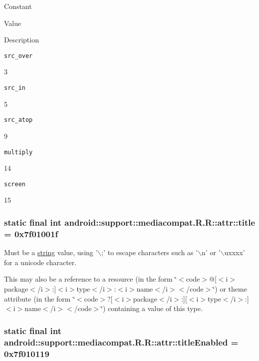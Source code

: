 Constant

Value

Description 

{\tt src\_\-over}

3

{\tt src\_\-in}

5

{\tt src\_\-atop}

9

{\tt multiply}

14

{\tt screen}

15\hypertarget{classandroid_1_1support_1_1mediacompat_1_1_r_1_1attr_e13bbc3f2499e6333d12d64127632045}{
\subsubsection[{title}]{\setlength{\rightskip}{0pt plus 5cm}static final int android::support::mediacompat.R.R::attr::title = 0x7f01001f}}
\label{classandroid_1_1support_1_1mediacompat_1_1_r_1_1attr_e13bbc3f2499e6333d12d64127632045}


Must be a \hyperlink{classandroid_1_1support_1_1mediacompat_1_1_r_1_1string}{string} value, using '$\backslash$;' to escape characters such as '$\backslash$n' or '$\backslash$uxxxx' for a unicode character. 

This may also be a reference to a resource (in the form \char`\"{}$<$code$>$@\mbox{[}$<$i$>$package$<$/i$>$:\mbox{]}$<$i$>$type$<$/i$>$:$<$i$>$name$<$/i$>$$<$/code$>$\char`\"{}) or theme attribute (in the form \char`\"{}$<$code$>$?\mbox{[}$<$i$>$package$<$/i$>$:\mbox{]}\mbox{[}$<$i$>$type$<$/i$>$:\mbox{]}$<$i$>$name$<$/i$>$$<$/code$>$\char`\"{}) containing a value of this type. \hypertarget{classandroid_1_1support_1_1mediacompat_1_1_r_1_1attr_506c6631e0ca66bdcc5236cbe17dca97}{
\subsubsection[{titleEnabled}]{\setlength{\rightskip}{0pt plus 5cm}static final int android::support::mediacompat.R.R::attr::titleEnabled = 0x7f010119}}
\label{classandroid_1_1support_1_1mediacompat_1_1_r_1_1attr_506c6631e0ca66bdcc5236cbe17dca97}


